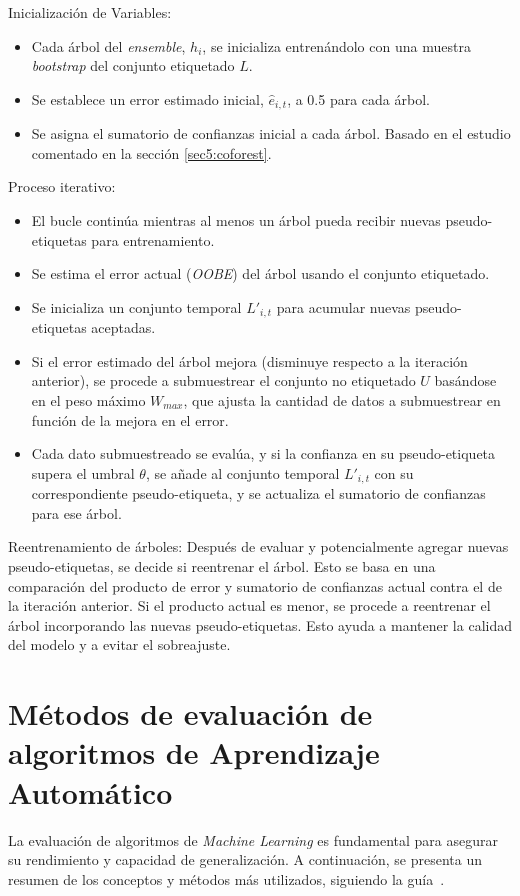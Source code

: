 Inicialización de Variables:
\begin{itemize}
	\item Cada árbol del \textit{ensemble}, $h_i$, se inicializa entrenándolo con una muestra \textit{bootstrap} del conjunto etiquetado $L$.
	\item Se establece un error estimado inicial, $\hat{e}_{i,t}$, a 0.5 para cada árbol.
	\item Se asigna el sumatorio de confianzas inicial a cada árbol. Basado en el estudio comentado en la sección \ref{sec5:coforest}.
\end{itemize}

Proceso iterativo:
\begin{itemize}
	\item El bucle continúa mientras al menos un árbol pueda recibir nuevas pseudo-etiquetas para entrenamiento.
	\item Se estima el error actual (\textit{OOBE}) del árbol usando el conjunto etiquetado.
	\item Se inicializa un conjunto temporal $L'_{i,t}$ para acumular nuevas pseudo-etiquetas aceptadas.
	\item Si el error estimado del árbol mejora (disminuye respecto a la iteración anterior), se procede a submuestrear el conjunto no etiquetado $U$ basándose en el peso máximo $W_{max}$, que ajusta la cantidad de datos a submuestrear en función de la mejora en el error.
	\item Cada dato submuestreado se evalúa, y si la confianza en su pseudo-etiqueta supera el umbral $\theta$, se añade al conjunto temporal $L'_{i,t}$ con su correspondiente pseudo-etiqueta, y se actualiza el sumatorio de confianzas para ese árbol.
\end{itemize}

Reentrenamiento de árboles:
Después de evaluar y potencialmente agregar nuevas pseudo-etiquetas, se decide si reentrenar el árbol. Esto se basa en una comparación del producto de error y sumatorio de confianzas actual contra el de la iteración anterior. Si el producto actual es menor, se procede a reentrenar el árbol incorporando las nuevas pseudo-etiquetas. Esto ayuda a mantener la calidad del modelo y a evitar el sobreajuste.

\section{Métodos de evaluación de algoritmos de Aprendizaje Automático}
La evaluación de algoritmos de \textit{Machine Learning} es fundamental para asegurar su rendimiento y capacidad de generalización. A continuación, se presenta un resumen de los conceptos y métodos más utilizados, siguiendo la guía~\cite{web:crossVal}.
